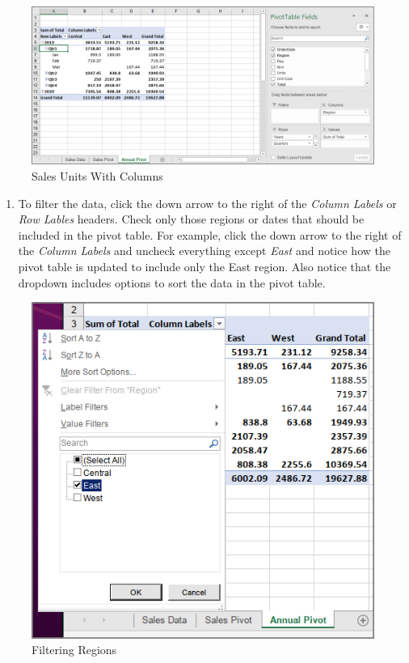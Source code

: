 	\begin{figure}[H]
	\centering
	\includegraphics[width=\maxwidth{.95\linewidth}]{gfx/ch07_fig21}
	\caption{Sales Units With Columns}
	\label{07:fig21}
	\end{figure}

	\begin{enumerate}[resume]
	\item To filter the data, click the down arrow to the right of the \textit{Column Labels} or \textit{Row Lables} headers. Check only those regions or dates that should be included in the pivot table. For example, click the down arrow to the right of the \textit{Column Labels} and uncheck everything except \textit{East} and notice how the pivot table is updated to include only the East region. Also notice that the dropdown includes options to sort the data in the pivot table.
\end{enumerate}

\begin{figure}[H]
	\centering
	\includegraphics[width=\maxwidth{.95\linewidth}]{gfx/ch07_fig22}
	\caption{Filtering Regions}
	\label{07:fig22}
\end{figure}

